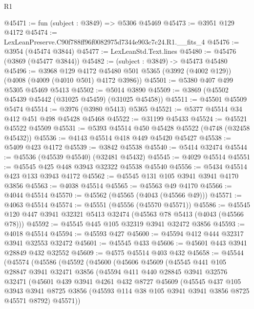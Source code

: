 \begin{lexlean}{R1}
\begin{coremodule}
@45471 := fun (subject : @3849) => @5306 @45469
@45473 := @3951 @129 @4172
@45474 := LexLeanPreserve.C90f788ff96f0082975d7344e903c7c24.R1.__fits_4
@45476 := @3954 (@45474 @3844)
@45477 := LexLeanStd.Text.lines
@45480 := @45476 (@3869 (@45477 @3844))
@45482 := (subject : @3849) -> @45473 @45480
@45496 := @3968
    @129
    @4172
    @45480
    @501
    @5365
    (@3992 (@4002 @129))
    (@4008 (@4009 (@4010 @501) @4172 @3986))
@45501 := @5380 @407 @499 @5305 @45469 @5413
@45502 := @5014 @3890
@45509 := @3869 (@45502 @45439 @45442 (@31025 @45459) (@31025 @45458))
@45511 := @45501 @45509 @5474
@45514 := @3976 (@3980 @5413) @5365
@45521 := @5377 @45514 @34 @412 @451 @498 @45428 @45468
@45522 := @31199 @45433
@45524 := @45521 @45522 @45509
@45531 := @5393 @45514 @450 @45428 @45522 (@4748 (@32458 @45432))
@45536 := @4143 @45514 @418 @449 @45420 @45427
@45538 := @5409 @423 @4172
@45539 := @3842 @45538
@45540 := @5414 @32474
@45544 := @45536 (@45539 @45540) (@32481 @45432)
@45545 := @4029 @45514
@45551 := @45545 @425 @448 @3943 @32322 @45538 @45540
@45556 := @5434 @45514 @423 @133 @3943 @4172
@45562 := @45545 @131 @105 @3941 @3941 @4170 @3856
@45563 := @4038 @45514
@45565 := @45563 @49 @4170
@45566 := @4044 @45514
@45570 := @45562 (@45565 (@4043 (@45566 @49)))
@45571 := @4063 @45514
@45574 := @45551 (@45556 (@45570 @45571))
@45586 := @45545 @120 @447 @3941 @32321 @5413 @32474 (@45563 @78 @5413 (@4043 (@45566 @78)))
@45592 := @45545 @445 @105 @32319 @3941 @32472 @3856
@45593 := @4018 @45514
@45594 := @45593 @427
@45600 := @45594 @412 @444 @32317 @3941 @32553 @32472
@45601 := @45545 @433
@45606 := @45601 @443 @3941 @28849 @432 @32552
@45609 := @4575 @45514 @403 @432
@45658 := @45544
    (@45574
      (@45586
        (@45592
          (@45600
            (@45606
              @45609
              (@45545
                @441
                @105
                @28847
                @3941
                @32471
                @3856
                (@45594
                  @411
                  @440
                  @28845
                  @3941
                  @32576
                  @32471
                  (@45601
                    @439
                    @3941
                    @4261
                    @432
                    @8727
                    @45609
                    (@45545
                      @437
                      @105
                      @3943
                      @3941
                      @8725
                      @3856
                      (@45593 @114 @38 @105 @3941 @3941 @3856 @8725 @45571 @8792)
                      @45571))

\end{coremodule}
\end{lexlean}
